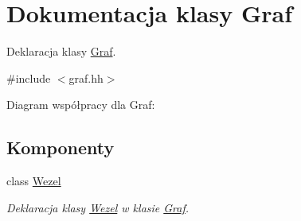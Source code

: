 \hypertarget{class_graf}{\section{\-Dokumentacja klasy \-Graf}
\label{class_graf}
}


\-Deklaracja klasy \hyperlink{class_graf}{\-Graf}.  




{\ttfamily \#include $<$graf.\-hh$>$}



\-Diagram współpracy dla \-Graf\-:
\subsection*{\-Komponenty}
\begin{DoxyCompactItemize}
\item 
class \hyperlink{class_graf_1_1_wezel}{\-Wezel}
\begin{DoxyCompactList}\small\item\em \-Deklaracja klasy \hyperlink{class_graf_1_1_wezel}{\-Wezel} w klasie \hyperlink{class_graf}{\-Graf}. \end{DoxyCompactList}\end{DoxyCompactItemize}
